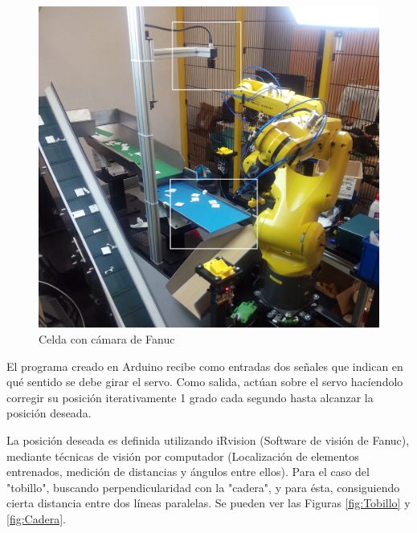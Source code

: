 \begin{figure}
\centering
\includegraphics[width=120mm]{Figures/CeldaFanuc}
\caption[Celda con cámara de Fanuc]{Celda con cámara de Fanuc}
\label{fig:CeldaFanuc}
\end{figure}

El programa creado en Arduino recibe como entradas dos señales que indican en qué sentido se debe girar el servo. Como salida, actúan sobre el servo hacíendolo corregir su posición iterativamente 1 grado cada segundo hasta alcanzar la posición deseada.

La posición deseada es definida utilizando iRvision (Software de visión de Fanuc), mediante técnicas de visión por computador (Localización de elementos entrenados, medición de distancias y ángulos entre ellos). Para el caso del "tobillo", buscando perpendicularidad con la "cadera", y para ésta, consiguiendo cierta distancia entre dos líneas paralelas. Se pueden ver las Figuras \ref{fig:Tobillo} y \ref{fig:Cadera}.

